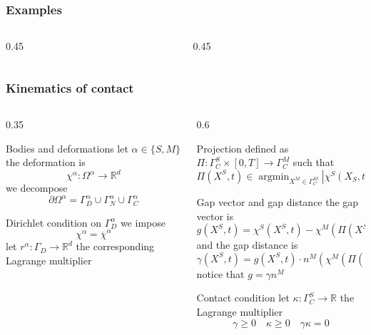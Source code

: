 \documentclass[8pt]{beamer}
\numberwithin{equation}{section}
\theoremstyle{definition}
\DeclareMathOperator{\argmin}{argmin}
\begin{document}
\begin{frame}
\frametitle{Examples}
\begin{columns}
\begin{column}{0.45\textwidth}
\begin{figure}
\end{figure}
\end{column}
\begin{column}{0.45\textwidth}
\begin{figure}
\end{figure}
\end{column}
\end{columns}
\end{frame}

\begin{frame}
\frametitle{Kinematics of contact}

\begin{columns}
\begin{column}{0.35\textwidth}
\begin{block}{Bodies and deformations}
let $\alpha\in\{S,M\}$ the deformation is
\[
\chi^\alpha\colon\Omega^\alpha\to\mathbb{R}^d
\]
we decompose
\[
\partial\Omega^\alpha=\Gamma_D^\alpha\cup\Gamma_N^\alpha\cup\Gamma_C^\alpha
\]
\end{block}
\begin{block}{Dirichlet condition}
on $\Gamma_D^\alpha$ we impose
\[
\chi^\alpha=\overline{\chi}^\alpha
\]
let $r^\alpha\colon\Gamma_D\to\mathbb{R}^d$ the corresponding Lagrange multiplier
\end{block}

\end{column}

\begin{column}{0.6\textwidth}
\begin{block}{Projection}
defined as $\Pi\colon\Gamma_C^S\times[0,T]\to\Gamma_C^M$ such that
\[
\Pi(X^S,t)\in\argmin_{X^M\in\Gamma_C^M}|\chi^S(X_S,t)-\chi^M(X_M,t)|
\]
\end{block}
\begin{block}{Gap vector and gap distance}
the gap vector is
\[
g(X^S,t)=\chi^S(X^S,t)-\chi^M(\Pi(X^S,t),t)
\]
and the gap distance is
\[
\gamma(X^S,t)=g(X^S,t)\cdot n^M(\chi^M(\Pi(X^S,t),t),t)
\]
notice that $g=\gamma n^M$
\end{block}
\begin{block}{Contact condition}
let $\kappa\colon\Gamma_C^S\to\mathbb{R}$ the Lagrange multiplier
\[
\gamma\ge0\quad\kappa\ge0\quad\gamma\kappa=0
\]
\end{block}
\end{column}
\end{columns}
\end{frame}
\end{document}
